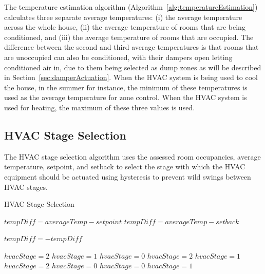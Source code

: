 The temperature estimation algorithm (Algorithm~\ref{alg:temperatureEstimation})
calculates three separate average temperatures: (i) the average temperature
across the whole house, (ii) the average temperature of rooms that are being
conditioned, and (iii) the average temperature of rooms that are occupied. The
difference between the second and third average temperatures is that rooms that
are unoccupied can also be conditioned, with their dampers open letting
conditioned air in, due to them being selected as dump zones as will be
described in Section~\ref{sec:damperActuation}. When the HVAC system is being
used to cool the house, in the summer for instance, the minimum of these
temperatures is used as the average temperature for zone control. When the HVAC
system is used for heating, the maximum of these three values is used.

\subsection{HVAC Stage Selection}
\label{sec:hvacStageSelection}

The HVAC stage selection algorithm uses the assessed room occupancies, average
temperature, setpoint, and setback to select the stage with which the HVAC
equipment should be actuated using hysteresis to prevent wild swings between
HVAC stages.

\begin{algorithm}                      %
\caption{HVAC Stage Selection}          %
\label{alg:hvacStageSelection}%
\begin{algorithmic}                    %
\STATE $tempDiff = averageTemp - setpoint$
\ELSE
\STATE $tempDiff = averageTemp - setback$
\ENDIF

\STATE $tempDiff = -tempDiff$
\ENDIF

\STATE $hvacStage = 2$
\STATE $hvacStage = 1$
\ELSE
\STATE $hvacStage = 0$
\ENDIF
{}
\STATE $hvacStage = 2$
\STATE $hvacStage = 1$
\ENDIF
{}
\STATE $hvacStage = 2$
\STATE $hvacStage = 0$
\ENDIF
\ELSE
{}
\STATE $hvacStage = 0$
\STATE $hvacStage = 1$
\ENDIF
\ENDIF
\end{algorithmic}
\end{algorithm}

